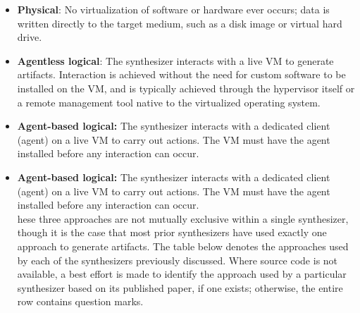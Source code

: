 \begin{itemize}
\item
  \textbf{Physical}: No virtualization of software or hardware ever
  occurs; data is written directly to the target medium, such as a disk
  image or virtual hard drive.\\
\item
  \textbf{Agentless logical}: The synthesizer interacts with a live VM
  to generate artifacts. Interaction is achieved without the need for
  custom software to be installed on the VM, and is typically achieved
  through the hypervisor itself or a remote management tool native to
  the virtualized operating system.\\
\item
  \textbf{Agent-based logical:} The synthesizer interacts with a
  dedicated client (agent) on a live VM to carry out actions. The VM
  must have the agent installed before any interaction can occur.
\item
  \textbf{Agent-based logical:} The synthesizer interacts with a
  dedicated client (agent) on a live VM to carry out actions. The VM
  must have the agent installed before any interaction can occur.\\
  hese three approaches are not mutually exclusive within a single
  synthesizer, though it is the case that most prior synthesizers have
  used exactly one approach to generate artifacts. The table below
  denotes the approaches used by each of the synthesizers previously
  discussed. Where source code is not available, a best effort is made
  to identify the approach used by a particular synthesizer based on its
  published paper, if one exists; otherwise, the entire row contains
  question marks.
\end{itemize}

